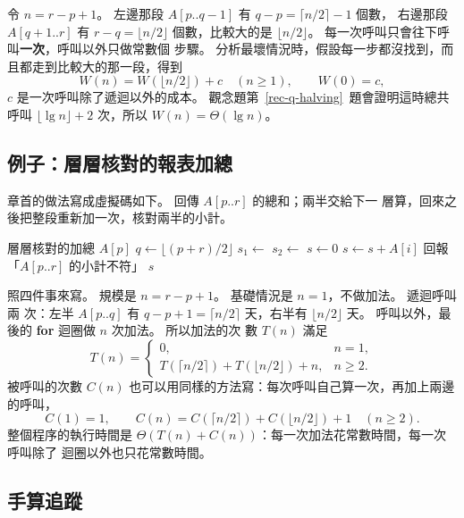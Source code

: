 令 $n = r - p + 1$。 左邊那段 $A[p..q-1]$ 有 $q - p = \lceil n/2 \rceil - 1$ 個數，
右邊那段 $A[q+1..r]$ 有 $r - q = \lfloor n/2 \rfloor$ 個數，比較大的是
$\lfloor n/2 \rfloor$。 每一次呼叫只會往下呼叫\textbf{一次}，呼叫以外只做常數個
步驟。 分析最壞情況時，假設每一步都沒找到，而且都走到比較大的那一段，得到
\[
W(n) = W(\lfloor n/2 \rfloor) + c \quad (n \ge 1), \qquad W(0) = c,
\]
$c$ 是一次呼叫除了遞迴以外的成本。 觀念題第~\ref{rec-q-halving}~題會證明這時總共呼叫
$\lfloor \lg n \rfloor + 2$ 次，所以 $W(n) = \Theta(\lg n)$。

\subsection{例子：層層核對的報表加總}

章首的做法寫成虛擬碼如下。  回傳 $A[p..r]$ 的總和；兩半交給下一
層算，回來之後把整段重新加一次，核對兩半的小計。

\begin{pseudo}[label=alg:rec-audit]{層層核對的加總}
        \State \Return $A[p]$
    \EndIf
    \State $q \gets \lfloor (p + r) / 2 \rfloor$
    \State $s_1 \gets$ 
    \State $s_2 \gets$ 
    \State $s \gets 0$
        \State $s \gets s + A[i]$ 
    \EndFor
        \State 回報「$A[p..r]$ 的小計不符」
    \EndIf
    \State \Return $s$
\EndFunction
\end{pseudo}

照四件事來寫。 規模是 $n = r - p + 1$。 基礎情況是 $n = 1$，不做加法。 遞迴呼叫兩
次：左半 $A[p..q]$ 有 $q - p + 1 = \lceil n/2 \rceil$ 天，右半有
$\lfloor n/2 \rfloor$ 天。 呼叫以外，最後的 \textbf{for} 迴圈做 $n$ 次加法。 所以加法的次
數 $T(n)$ 滿足
\[
T(n) = \begin{cases}
0, & n = 1, \\
T(\lceil n/2 \rceil) + T(\lfloor n/2 \rfloor) + n, & n \ge 2.
\end{cases}
\]
被呼叫的次數 $C(n)$ 也可以用同樣的方法寫：每次呼叫自己算一次，再加上兩邊的呼叫，
\[
C(1) = 1, \qquad C(n) = C(\lceil n/2 \rceil) + C(\lfloor n/2 \rfloor) + 1 \quad (n \ge 2).
\]
整個程序的執行時間是 $\Theta(T(n) + C(n))$：每一次加法花常數時間，每一次呼叫除了
迴圈以外也只花常數時間。

\subsection{手算追蹤}

